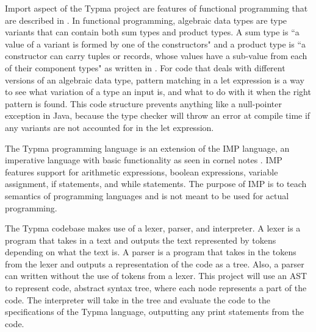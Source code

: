 \documentclass[10pt,twocolumn]{article}
\begin{document}
Import aspect of the Typma project are features of functional programming that are described in \textcite{OCaml}. In functional programming, algebraic data types are type variants that can contain both sum types and product types. A sum type is ``a value of a variant is formed by one of the constructors" and a product type is
``a constructor can carry tuples or records, whose values have a sub-value from each of their component types" as written in \textcite{OCaml}.
For code that deals with different versions of an algebraic data type, pattern matching
in a let expression is a way to see what variation of a type an input is, and what to do with it when the right pattern is found.
This code structure prevents anything like a null-pointer exception in Java, because the type checker will throw an error at compile time if any variants are not accounted for
in the let expression.

The Typma programming language is an extension of the IMP language, an imperative language with basic functionality as seen in cornel notes \textcite{CS4110IMP}. IMP features support for arithmetic expressions, boolean expressions, variable assignment, if statements, and while statements. The purpose of IMP is to teach semantics of programming languages and is not meant to be used for actual programming.

The Typma codebase makes use of a lexer, parser, and interpreter. A lexer is a program that takes in a text and outputs the text represented by tokens depending on what the text is. A parser is a program that takes in the tokens from the lexer and outputs a representation of
the code as a tree.
Also, a parser can written without the use of tokens from a lexer.
This project will use an AST to represent code, abstract syntax tree, where each node represents a part of the code. The interpreter will take in the tree and evaluate the code to the specifications of the Typma language, outputting any print statements from the code.
\end{document}

